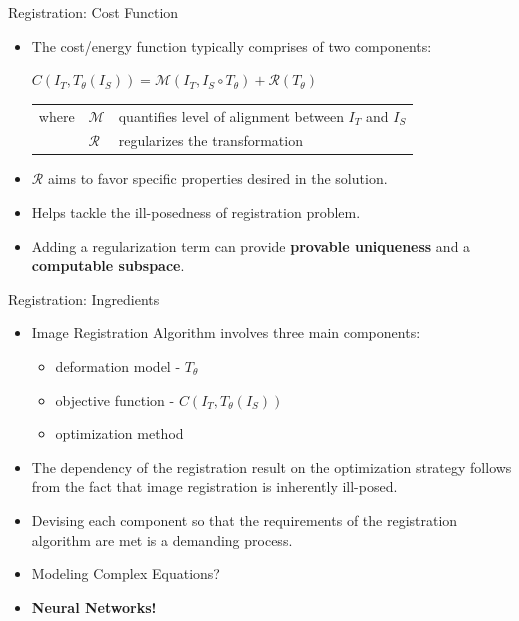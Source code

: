 \documentclass{beamer}
\begin{document}
\begin{frame}{Registration: Cost Function}
    \begin{itemize}
        \item The cost/energy function typically comprises of two components:
        \pause
        \begin{block}{}
			\begin{center}$C(I_T,T_{\theta}(I_S)) = \mathcal{M}(I_T,I_S \circ T_{\theta})+\mathcal{R}(T_{\theta})$
			\end{center}
		\end{block}
		\begin{tabular}{l l l }
            where&$\mathcal{M}$ & quantifies level of alignment between $I_T$ and $I_S$\\ &$\mathcal{R}$& regularizes the transformation \\
        \end{tabular}
        \pause
        \item $\mathcal{R}$ aims to favor specific properties desired in the solution.
        \pause
        \item Helps tackle the ill-posedness of registration problem.
        \pause
        \item Adding a regularization term can provide \textbf{provable uniqueness} and a \textbf{computable subspace}.
    \end{itemize}
\end{frame}

\begin{frame}{Registration: Ingredients}
	\begin{itemize}
  		\item Image Registration Algorithm involves three main components:
  		    \begin{itemize}
  		        \pause
  		        \item deformation model - $T_{\theta}$
  		        \pause
  		        \item objective function - $C(I_T,T_{\theta}(I_S))$
  		        \pause
  		        \item optimization method
  		    \end{itemize}
  		\pause
  		\item The dependency of the registration result on the optimization strategy follows from the fact that image registration is inherently ill-posed.
  		\pause
  		\item Devising each component so that the requirements of the registration algorithm are met is a demanding process.
  		\pause
  		\item Modeling Complex Equations?
  		\pause
  		\item \textbf{Neural Networks!}
	\end{itemize}
\end{frame}
\end{document}
